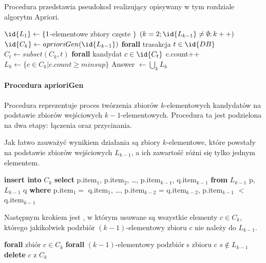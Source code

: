 Procedura  przedstawia pseudokod realizujący opisywany w tym rozdziale algorytm Apriori.

\begin{codebox}
	\label{apriori:listing}
	\li $\id{L_1} \gets \lbrace 1$-elementowe zbiory częste $\rbrace$
		\li \For $(k = 2; \id{L_{k-1}} \neq \emptyset; k++)$
		\li \Do
			\li $\id{C_k} \gets aprioriGen(\id{L_{k-1}})$
			\li \textbf{forall} trasakcja $t \in \id{DB}$
			\li \Do
					\li $C_t \gets subset(C_k, t)$
					\li \textbf{forall} kandydat $c \in \id{C_t}$
					\li \Do c.count++
					\End
				\End
			\li $L_k \gets \lbrace c \in C_k | c.count \geq minsup \rbrace$	
		\End
	\li Answer $\gets \bigcup_k L_k $
\end{codebox}

\paragraph{Procedura aprioriGen}
Procedura  reprezentuje proces twórzenia zbiorów $k$-elementowych kandydatów na podstawie zbiorów wejściowych ${k-1}$-elementowych. Procedura ta jest podzielona na dwa etapy: łączenia oraz przycinania. 

Jak łatwo zauważyć wynikiem działania  są zbiory $k$-elementowe, które powstały na podstawie zbiorów wejściowych $L_{k-1}$, a ich zawartość różni się tylko jednym elementem.

\begin{codebox}
	\li \textbf{insert into} $C_k$
	\li \textbf{select} p.item$_1$, p.item$_2$, \dots, p.item$_{k-1}$, q.item$_{k-1}$
	\li \textbf{from} $L_{k-1}$ p, $L_{k-1}$ q
	\li \textbf{where} p.item$_1 = $ q.item$_1$, \dots, p.item$_{k-2}$ = q.item$_{k-2}$, p.item$_{k-1}$ $<$ q.item$_{k-1}$
\end{codebox}

Następnym krokiem jest , w którym usuwane są wszystkie elementy $c \in C_k$, którego jakikolwiek podzbiór $(k-1)$-elementowy zbioru $c$ nie należy do $L_{k-1}$.

\begin{codebox}
		\li \textbf{forall} zbiór $c \in C_k$ 
		\li \Do
			\li \textbf{forall} $(k-1)$-elementowy podzbiór s zbioru $c$
					\li \Do 
						\li \If $s \notin L_{k-1}$
						\li \Then
							\li \textbf{delete} $c$ z $C_k$
						\End
					\End
		\End
\end{codebox}

